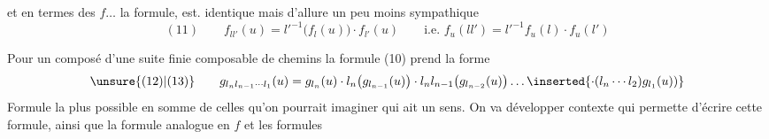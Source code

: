 et en termes des $f\ldots$ la formule, est. identique mais d'allure un peu moins sympathique
\[
(11)\qquad f_{ll'}(u)=l'^{-1}\bigl(f_l(u)\bigr)\cdot f_{l'}(u)
\qquad\text{i.e. }f_u(ll')=l'^{-1}f_u(l)\cdot f_u(l')
\]


Pour un composé d'une  suite finie composable de chemins
la formule (10) prend la forme
\[
\unsure{(12)|(13)}\qquad
 g_{l_nl_{n-1}\cdots l_1}(u)=g_{l_n}(u)\cdot l_n\bigl(g_{l_{n-1}}(u)\bigr)\cdot l_nl_{n-1}\bigl(g_{l_{n-2}}(u)\bigr)\ldots
 \inserted{\cdot(l_n\cdots l_2)g_{l_1}(u))}
\]
Formule la plus   possible en somme de celles qu'on pourrait imaginer qui ait un sens. On va développer   contexte qui permette  d'écrire cette formule, ainsi que  la formule analogue en $f$ et les formules

